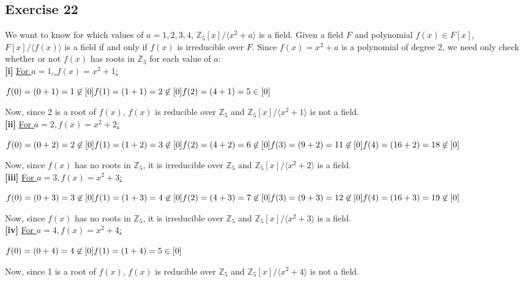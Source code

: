 \subsection*{Exercise 22}
We want to know for which values of $a = 1,2,3,4$, $\mathbb{Z}_5[x]/\langle x^2 + a \rangle$ is a field. Given a field $F$ and polynomial $f(x) \in F[x]$, $F[x]/\langle f(x) \rangle$ is a field if and only if $f(x)$ is irreducible over $F$. Since $f(x) = x^2 + a$ is a polynomial of degree 2, we need only check whether or not $f(x)$ has roots in $\mathbb{Z}_5$ for each value of $a$: \\

\textbf{[i]} \underline{For $a = 1$, $f(x) = x^2 + 1$:}

$f(0) = (0 + 1) = 1 \not\in [0] \\
f(1) = (1 + 1) = 2 \not\in [0] \\
f(2) = (4 + 1) = 5 \in [0]$

Now, since 2 is a root of $f(x)$, $f(x)$ is reducible over $\mathbb{Z}_5$ and $\mathbb{Z}_5[x]/\langle x^2 + 1 \rangle$ is not a field. \\

\textbf{[ii]} \underline{For $a = 2, f(x) = x^2 + 2$:}

$f(0) = (0 + 2) = 2 \not\in [0] \\
f(1) = (1 + 2) = 3 \not\in [0] \\
f(2) = (4 + 2) = 6 \not\in [0] \\
f(3) = (9 + 2) = 11 \not\in [0] \\
f(4) = (16 + 2) = 18 \not\in [0]$

Now, since $f(x)$ has no roots in $\mathbb{Z}_5$, it is irreducible over $\mathbb{Z}_5$ and $\mathbb{Z}_5[x]/\langle x^2 + 2 \rangle$ is a field. \\

\textbf{[iii]} \underline{For $a = 3, f(x) = x^2 + 3$:}

$f(0) = (0 + 3) = 3 \not\in [0] \\
f(1) = (1 + 3) = 4 \not\in [0] \\
f(2) = (4 + 3) = 7 \not\in [0] \\
f(3) = (9 + 3) = 12 \not\in [0] \\
f(4) = (16 + 3) = 19 \not\in [0]$

Now, since $f(x)$ has no roots in $\mathbb{Z}_5$, it is irreducible over $\mathbb{Z}_5$ and $\mathbb{Z}_5[x]/\langle x^2 + 3 \rangle$ is a field. \\

\textbf{[iv]} \underline{For $a = 4, f(x) = x^2 + 4$:}

$f(0) = (0 + 4) = 4 \not\in [0] \\
f(1) = (1 + 4) = 5 \in [0]$

Now, since 1 is a root of $f(x)$, $f(x)$ is reducible over $\mathbb{Z}_5$ and $\mathbb{Z}_5[x]/\langle x^2 + 4 \rangle$ is not a field.